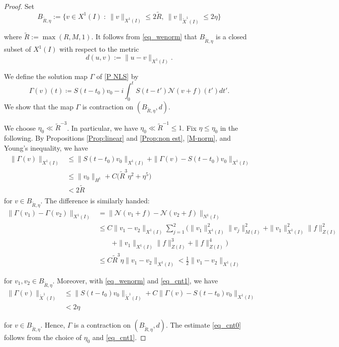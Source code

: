 \documentclass[letterpaper, 11pt,  reqno]{amsart}
\newcommand{\1}{\hspace{0.5mm}\text{I}\hspace{0.5mm}}
\newcommand{\noi}{\noindent}
\newcommand{\G}{\Gamma}
\newcommand{\wt}{\widetilde}
\newcommand{\NN}{\mathcal{N}}
\numberwithin{equation}{section}
\numberwithin{theorem}{section}
\begin{document}
\begin{proof}
Set
\[
 B_{\wt R, \eta}:=\{
 v\in  X^1(I)
 \; : \:
 \| v \|_{X^1(I)} \leq 2 \wt R ,\
 \| v\|_{\wt X^1 (I)} \leq 2 \eta\}
\]

 \noi
 where 
 $\wt R := \max(R,M,1)$.
It follows from \eqref{eq_wenorm} that $B_{\wt R, \eta}$ is a closed subset of $X^1(I)$ with respect to the metric
\[
d(u,v) := \| u-v \|_{X^1(I)}.
\]

We define the solution map $\Gamma$ of \eqref{P NLS} by
\begin{equation*}
    \Gamma(v)(t) \coloneqq
    S(t-t_0)v_0
    -i \int_0^t S(t-t') \NN(v+f) (t') dt'.
\end{equation*}
We show that the map $\Gamma$
 is contraction on $(B_{\wt R, \eta}, d)$.




We choose $\eta_0\ll \wt R^{-3}$.
 In particular, 
 we have $\eta_0 \ll \wt R^{-1} \leq 1$.
 Fix $\eta \leq \eta_0$ in the following.
By  Propositions \ref{Prop:linear} and \ref{Prop:non est},
\eqref{M-norm},
and Young's inequality,
we have
\begin{align}
\label{eq_cnt1}
\begin{aligned}
    \|\Gamma(v)\|_{X^1(I)}
    &\leq 
    \|S(t-t_0)v_0\|_{X^1(I)}
    +\| \Gamma(v) - S(t-t_0)v_0 \|_{X^1(I)}    \\
&\leq
\|v_0\|_{H^1}
+ C \big(
\wt R^3 \eta^2
+ \eta^5
\big)
\\
&
<2 \wt R
\end{aligned}
\end{align}
for 
$v \in  B_{\wt R, \eta}$.
The difference
is similarly handed:
\begin{equation*}
\begin{split}
    \|\Gamma(v_1)-\Gamma(v_2)\|_{X^1(I)}
    &=
    \big\| \NN(v_1+f) - \NN(v_2+f) \big\|_{N^1(I)}\\
    &\leq
    C\|v_1-v_2\|_{X^1(I)} \sum_{j=1}^2
\big(
\|v_1\|_{X^1 (I)}^2 \|v_j\|_{M(I)}^2
+ \|v_1\|_{X^1 (I)}^2 \| f\|_{Z(I)}^2
\\
&\qquad
+ \|v_1\|_{X^1 (I)} \|f\|_{Z(I)}^3
+\|f\|_{Z(I)}^4
    \big)\\
&\leq
C \wt R^3 \eta \|v_1-v_2\|_{X^1(I)} < \frac12 \|v_1-v_2\|_{X^1(I)}
\end{split}
\end{equation*}



\noi
for 
$v_1, v_2 \in  B_{\wt R, \eta}$.
Moreover, with \eqref{eq_wenorm} and \eqref{eq_cnt1},
we have
\begin{equation*}
\begin{split}
\|\Gamma(v)\|_{\wt X^1 (I)}
&\leq
\|S(t-t_0)v_0\|_{\wt X^1(I)}
+ C\| \Gamma(v) - S(t-t_0)v_0 \|_{X^1(I)}
\\
&<2\eta
\end{split}
\end{equation*}

\noi
for
$v\in  B_{\wt R, \eta}$.
Hence, $\G$ is a contraction on $(B_{\wt R, \eta}, d)$.
 The estimate \eqref{eq_cnt0} follows from 
 the choice of $\eta_0$
 and \eqref{eq_cnt1}.
\end{proof}
\end{document}
